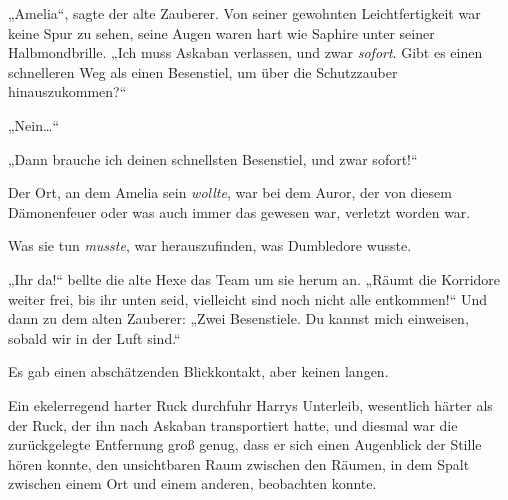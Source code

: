 „Amelia“, sagte der alte Zauberer. Von seiner gewohnten Leichtfertigkeit war keine Spur zu sehen, seine Augen waren hart wie Saphire unter seiner Halbmondbrille. „Ich muss Askaban verlassen, und zwar \emph{sofort}. Gibt es einen schnelleren Weg als einen Besenstiel, um über die Schutzzauber hinauszukommen?“

„Nein…“

„Dann brauche ich deinen schnellsten Besenstiel, und zwar sofort!“

Der Ort, an dem Amelia sein \emph{wollte}, war bei dem Auror, der von diesem Dämonenfeuer oder was auch immer das gewesen war, verletzt worden war.

Was sie tun \emph{musste}, war herauszufinden, was Dumbledore wusste.

„Ihr da!“ bellte die alte Hexe das Team um sie herum an. „Räumt die Korridore weiter frei, bis ihr unten seid, vielleicht sind noch nicht alle entkommen!“ Und dann zu dem alten Zauberer: „Zwei Besenstiele. Du kannst mich einweisen, sobald wir in der Luft sind.“

Es gab einen abschätzenden Blickkontakt, aber keinen langen.

\later

Ein ekelerregend harter Ruck durchfuhr Harrys Unterleib, wesentlich härter als der Ruck, der ihn nach Askaban transportiert hatte, und diesmal war die zurückgelegte Entfernung groß genug, dass er sich einen Augenblick der Stille hören konnte, den unsichtbaren Raum zwischen den Räumen, in dem Spalt zwischen einem Ort und einem anderen, beobachten konnte.

